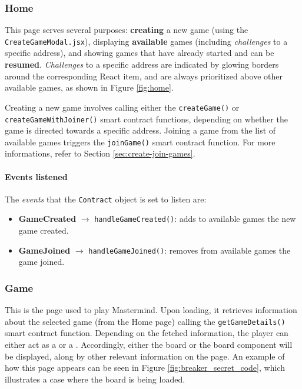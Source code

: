 \subsubsection{Home}

This page serves several purposes: \textbf{creating} a new game (using the \texttt{CreateGameModal.jsx}), displaying \textbf{available} games (including \textit{challenges} to a specific address), and showing games that have already started and can be \textbf{resumed}. \textit{Challenges} to a specific address are indicated by glowing borders around the corresponding React item, and are always prioritized above other available games, as shown in Figure \ref{fig:home}.

Creating a new game involves calling either the \texttt{createGame()} or \texttt{createGameWithJoiner()} smart contract functions, depending on whether the game is directed towards a specific address. Joining a game from the list of available games triggers the \texttt{joinGame()} smart contract function. For more informations, refer to Section \ref{sec:create-join-games}.

\paragraph*{Events listened}

The \textit{events} that the \texttt{Contract} object is set to listen are: 
\begin{itemize}
    \item \textbf{GameCreated} $\rightarrow$ \texttt{handleGameCreated()}: adds to available games the new game created.
    \item \textbf{GameJoined} $\rightarrow$ \texttt{handleGameJoined()}: removes from available games the game joined.
\end{itemize}

\subsubsection{Game}

This is the page used to play Mastermind. Upon loading, it retrieves information about the selected game (from the Home page) calling the \texttt{getGameDetails()} smart contract function. Depending on the fetched information, the player can either act as a  or a . Accordingly, either the  board or the  board component will be displayed, along by other relevant information on the page. An example of how this page appears can be seen in Figure \ref{fig:breaker_secret_code}, which illustrates a case where the  board is being loaded.

